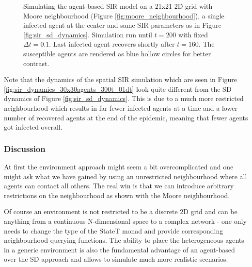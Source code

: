 \begin{figure}
\begin{center}
	\caption{Simulating the agent-based SIR model on a 21x21 2D grid with Moore neighbourhood (Figure \ref{fig:moore_neighbourhood}), a single infected agent at the center and same SIR parameters as in Figure \ref{fig:sir_sd_dynamics}. Simulation run until $t = 200$ with fixed $\Delta t = 0.1$. Last infected agent recovers shortly after $t = 160$. The susceptible agents are rendered as blue hollow circles for better contrast.}
	\label{fig:sir_env}
\end{center}
\end{figure}

Note that the dynamics of the spatial SIR simulation which are seen in Figure \ref{fig:sir_dynamics_30x30agents_300t_01dt} look quite different from the SD dynamics of Figure \ref{fig:sir_sd_dynamics}. This is due to a much more restricted neighbourhood which results in far fewer infected agents at a time and a lower number of recovered agents at the end of the epidemic, meaning that fewer agents got infected overall.

\subsubsection{Discussion}
At first the environment approach might seem a bit overcomplicated and one might ask what we have gained by using an unrestricted neighbourhood where all agents can contact all others. The real win is that we can introduce arbitrary restrictions on the neighbourhood as shown with the Moore neighbourhood.

Of course an environment is not restricted to be a discrete 2D grid and can be anything from a continuous N-dimensional space to a complex network - one only needs to change the type of the StateT monad and provide corresponding neighbourhood querying functions. The ability to place the heterogeneous agents in a generic environment is also the fundamental advantage of an agent-based over the SD approach and allows to simulate much more realistic scenarios. 